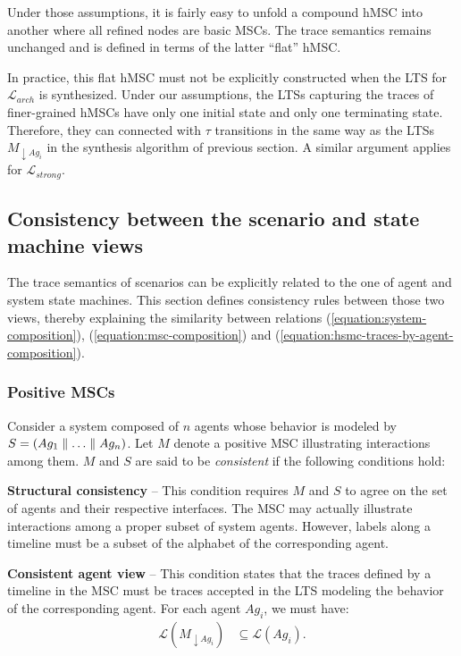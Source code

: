 Under those assumptions, it is fairly easy to unfold a compound hMSC into another where all refined nodes are basic MSCs. The trace semantics remains unchanged and is defined in terms of the latter ``flat'' hMSC. 

In practice, this flat hMSC must not be explicitly constructed when the LTS for $\mathcal{L}_{arch}$ is synthesized. Under our assumptions, the LTSs capturing the traces of finer-grained hMSCs have only one initial state and only one terminating state. Therefore, they can connected with $\tau$ transitions in the same way as the LTSs $M_{\downarrow Ag_i}$ in the synthesis algorithm of previous section. A similar argument applies for $\mathcal{L}_{strong}$.

\subsection{Consistency between the scenario and state machine views\label{subsection:background-scenario-consistency}}

The trace semantics of scenarios can be explicitly related to the one of agent and system state machines. This section defines consistency rules between those two views, thereby explaining the similarity between relations (\ref{equation:system-composition}), (\ref{equation:msc-composition}) and (\ref{equation:hsmc-traces-by-agent-composition}).

\subsubsection*{Positive MSCs}

Consider a system composed of $n$ agents whose behavior is modeled by $S = (Ag_1 \parallel \ldots \parallel Ag_n)$. Let $M$ denote a positive MSC illustrating interactions among them. $M$ and $S$ are said to be \emph{consistent} if the following conditions hold:

\noindent \textbf{Structural consistency} -- This condition requires $M$ and $S$ to agree on the set of agents and their respective interfaces. The MSC may actually illustrate interactions among a proper subset of system agents. However, labels along a timeline must be a subset of the alphabet of the corresponding agent.

\noindent \textbf{Consistent agent view} -- This condition states that the traces defined by a timeline in the MSC must be traces accepted in the LTS modeling the behavior of the corresponding agent. For each agent $Ag_i$, we must have:
\begin{align}\mathcal{L}(M_{\downarrow Ag_i}) & \subseteq \mathcal{L}(Ag_i)\label{condition:consistent-agent-view}.\end{align}

